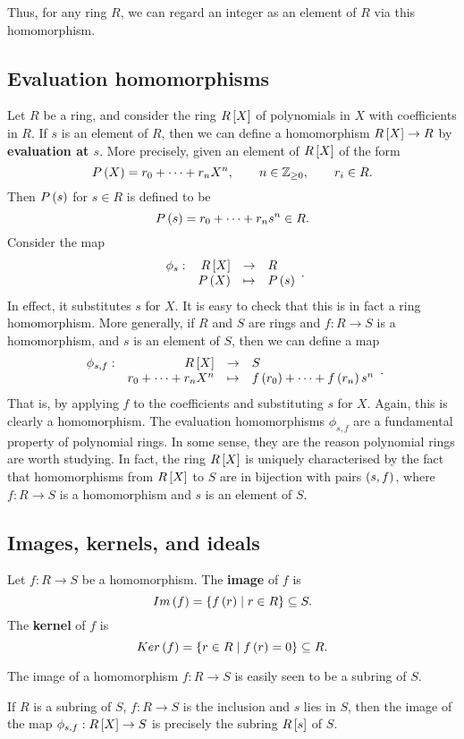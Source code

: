 Thus, for any ring $ R $, we can regard an integer as an element of $ R $ via this homomorphism.

\subsection{Evaluation homomorphisms}

Let $ R $ be a ring, and consider the ring $ R\sb{X} $ of polynomials in $ X $ with coefficients in $ R $. If $ s $ is an element of $ R $, then we can define a homomorphism $ R\sb{X} \to R $ by \textbf{evaluation at $ s $}. More precisely, given an element of $ R\sb{X} $ of the form
$$ P\rb{X} = r_0 + \dots + r_nX^n, \qquad n \in \Z_{\ge 0}, \qquad r_i \in R. $$
Then $ P\rb{s} $ for $ s \in R $ is defined to be
$$ P\rb{s} = r_0 + \dots + r_ns^n \in R. $$
Consider the map
$$ \function[\phi_s]{R\sb{X}}{R}{P\rb{X}}{P\rb{s}}. $$
In effect, it substitutes $ s $ for $ X $. It is easy to check that this is in fact a ring homomorphism. More generally, if $ R $ and $ S $ are rings and $ f : R \to S $ is a homomorphism, and $ s $ is an element of $ S $, then we can define a map
$$ \function[\phi_{s, f}]{R\sb{X}}{S}{r_0 + \dots + r_nX^n}{f\rb{r_0} + \dots + f\rb{r_n}s^n}. $$
That is, by applying $ f $ to the coefficients and substituting $ s $ for $ X $. Again, this is clearly a homomorphism. The evaluation homomorphisms $ \phi_{s, f} $ are a fundamental property of polynomial rings. In some sense, they are the reason polynomial rings are worth studying. In fact, the ring $ R\sb{X} $ is uniquely characterised by the fact that homomorphisms from $ R\sb{X} $ to $ S $ are in bijection with pairs $ \rb{s, f} $, where $ f : R \to S $ is a homomorphism and $ s $ is an element of $ S $.

\subsection{Images, kernels, and ideals}

\begin{definition}
Let $ f : R \to S $ be a homomorphism. The \textbf{image} of $ f $ is
$$ Im\rb{f} = \cb{f\rb{r} \mid r \in R} \subseteq S. $$
The \textbf{kernel} of $ f $ is
$$ Ker\rb{f} = \cb{r \in R \mid f\rb{r} = 0} \subseteq R. $$
\end{definition}

The image of a homomorphism $ f : R \to S $ is easily seen to be a subring of $ S $.

\begin{example*}
If $ R $ is a subring of $ S $, $ f : R \to S $ is the inclusion and $ s $ lies in $ S $, then the image of the map $ \phi_{s, f} : R\sb{X} \to S $ is precisely the subring $ R\sb{s} $ of $ S $.
\end{example*}

